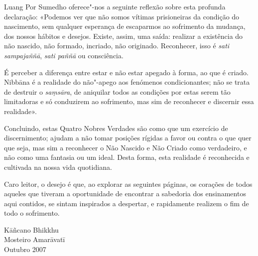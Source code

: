 Luang Por Sumedho oferece"-nos a seguinte reflexão sobre esta profunda
declaração: «Podemos ver que não somos vítimas prisioneiras da condição do
nascimento, sem qualquer esperança de escaparmos ao sofrimento da mudança, dos
nossos hábitos e desejos. Existe, assim, uma saída: realizar a existência do não
nascido, não formado, incriado, não originado. Reconhecer, isso é \emph{sati
  sampajaññā}, \emph{sati paññā} ou consciência.

É perceber a diferença entre
estar e não estar apegado à forma, ao que é criado. Nibbāna é a realidade do
não"-apego aos fenómenos condicionantes; não se trata de destruir o
\emph{saṃsāra}, de aniquilar todos as condições por estas serem tão limitadoras
e só conduzirem ao sofrimento, mas sim de reconhecer e discernir essa realidade».

Concluindo, estas Quatro Nobres Verdades são como que um exercício de
discernimento; ajudam a não tomar posições rígidas a favor ou contra o que quer
que seja, mas sim a reconhecer o Não Nascido e Não Criado como verdadeiro, e não
como uma fantasia ou um ideal. Desta forma, esta realidade é reconhecida e
cultivada na nossa vida quotidiana.

Caro leitor, o desejo é que, ao explorar as seguintes páginas, os corações de
todos aqueles que tiveram a oportunidade de encontrar a sabedoria dos
ensinamentos aqui contidos, se sintam inspirados a despertar, e rapidamente
realizem o fim de todo o sofrimento.

\bigskip

{\raggedleft
  Kāñcano Bhikkhu\\
  Mosteiro Amarāvatī\\
  Outubro 2007
\par}

